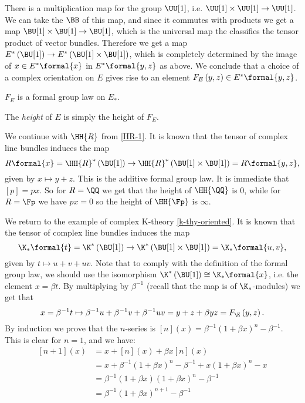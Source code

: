 There is a multiplication map for the group $\UU[1]$, i.e. $\UU[1] \times \UU[1] \to \UU[1]$.
We can take the $\BB$ of this map, and since it commutes with products we get a map $\BU[1] \times \BU[1] \to \BU[1]$, which is the universal map the classifies the tensor product of vector bundles.
Therefore we get a map $E^*\left(\BU[1]\right) \to E^*\left(\BU[1] \times \BU[1]\right)$, which is completely determined by the image of $x \in E^*\formal{x}$ in $E^*\formal{y,z}$ as above.
We conclude that a choice of a complex orientation on $E$ gives rise to an element $F_E\left(y,z\right) \in E^*\formal{y,z}$.

\begin{proposition}
	$F_E$ is a formal group law on $E_*$.
\end{proposition}

\begin{definition}
	The \emph{height} of $E$ is simply the height of $F_E$.
\end{definition}

\begin{example}\label{HR-2}
	We continue with $\HH{R}$ from \ref{HR-1}.
	It is known that the tensor of complex line bundles induces the map
	$$
	R\formal{x}
	= \HH{R}^*\left(\BU[1]\right)
	\to \HH{R}^*\left(\BU[1] \times \BU[1]\right)
	= R\formal{y,z},
	$$
	given by $x \mapsto y + z$.
	This is the additive formal group law.
	It is immediate that $\left[p\right] = p x$.
	So for $R = \QQ$ we get that the height of $\HH{\QQ}$ is 0, while for $R = \Fp$ we have $p x = 0$ so the height of $\HH{\Fp}$ is $\infty$.
\end{example}

\begin{example}\label{k-thy-fgl}
	We return to the example of complex K-theory \ref{k-thy-oriented}.
	It is known that the tensor of complex line bundles induces the map
	$$
	\K_*\formal{t}
	= \K^*\left(\BU[1]\right)
	\to \K^*\left(\BU[1] \times \BU[1]\right)
	= \K_*\formal{u,v},
	$$
	given by $t \mapsto u + v + u v$.
	Note that to comply with the definition of the formal group law, we should use the isomorphism
	$\K^*\left(\BU[1]\right) \cong \K_* \formal{x}$,
	i.e. the element $x = \beta t$.
	By multiplying by $\beta^{-1}$ (recall that the map is of $\K_*$-modules) we get that
	$$
	x
	= \beta^{-1} t \mapsto \beta^{-1} u + \beta^{-1} v + \beta^{-1} u v
	= y + z + \beta y z
	= F_{\K}\left(y,z\right).
	$$
	By induction we prove that the $n$-series is $\left[n\right]\left(x\right) = \beta^{-1} \left(1 + \beta x\right)^n - \beta^{-1}$.
	This is clear for $n = 1$, and we have:
	\begin{align*}
		\left[n+1\right]\left(x\right)
		&= x + \left[n\right]\left(x\right) + \beta x \left[n\right]\left(x\right)\\
		&= x + \beta^{-1} \left(1 + \beta x\right)^n - \beta^{-1} + x \left(1 + \beta x\right)^n - x\\
		&= \beta^{-1} \left(1 + \beta x\right) \left(1 + \beta x\right)^n - \beta^{-1}\\
		&= \beta^{-1} \left(1 + \beta x\right)^{n+1} - \beta^{-1}
	\end{align*}
\end{example}

